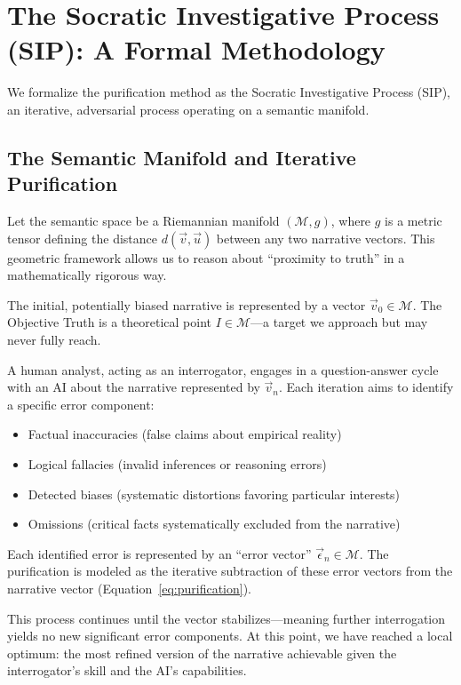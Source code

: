 \documentclass[11pt,a4paper]{article}
\begin{document}
\section{The Socratic Investigative Process (SIP): A Formal Methodology}

We formalize the purification method as the Socratic Investigative Process (SIP), an iterative, adversarial process operating on a semantic manifold.

\subsection{The Semantic Manifold and Iterative Purification}

Let the semantic space be a Riemannian manifold $(\mathcal{M}, g)$, where $g$ is a metric tensor defining the distance $d(\vec{v}, \vec{u})$ between any two narrative vectors. This geometric framework allows us to reason about ``proximity to truth'' in a mathematically rigorous way.

The initial, potentially biased narrative is represented by a vector $\vec{v}_0 \in \mathcal{M}$. The Objective Truth is a theoretical point $I \in \mathcal{M}$---a target we approach but may never fully reach.

A human analyst, acting as an interrogator, engages in a question-answer cycle with an AI about the narrative represented by $\vec{v}_n$. Each iteration aims to identify a specific error component:
\begin{itemize}[nosep]
    \item Factual inaccuracies (false claims about empirical reality)
    \item Logical fallacies (invalid inferences or reasoning errors)
    \item Detected biases (systematic distortions favoring particular interests)
    \item Omissions (critical facts systematically excluded from the narrative)
\end{itemize}

Each identified error is represented by an ``error vector'' $\vec{\epsilon}_n \in \mathcal{M}$. The purification is modeled as the iterative subtraction of these error vectors from the narrative vector (Equation~\ref{eq:purification}).

This process continues until the vector stabilizes---meaning further interrogation yields no new significant error components. At this point, we have reached a local optimum: the most refined version of the narrative achievable given the interrogator's skill and the AI's capabilities.
\end{document}
